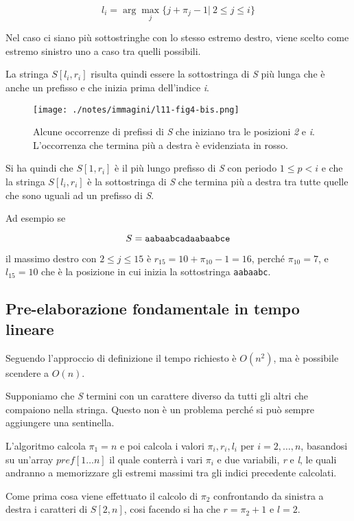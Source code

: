 $$
l_i = \arg\max\limits_{j} \{ j + \pi_j -1 | \: 2 \leq j \leq i\}
$$

Nel caso ci siano più sottostringhe con lo stesso estremo destro, viene scelto come estremo sinistro uno a caso tra quelli possibili.

La stringa $ S[l_i, r_i] $ risulta quindi essere la sottostringa di \textit{S} più lunga che è anche un prefisso e che inizia prima dell'indice \textit{i}.

\begin{figure}[htbp]
	\centering
	\texttt{[image: ./notes/immagini/l11-fig4-bis.png]}
	\caption{Alcune occorrenze di prefissi di \textit{S} che iniziano tra le posizioni \textit{2} e \textit{i}. L'occorrenza che termina più a destra è evidenziata in rosso.}
\end{figure}

Si ha quindi che $ S[1,r_i] $ è il più lungo prefisso di \textit{S} con periodo $ 1 \leq p < i $ e che la stringa $ S[l_i, r_i] $ è la sottostringa di \textit{S} che termina più a destra tra tutte quelle che sono uguali ad un prefisso di \textit{S}.

Ad esempio se 

$$
S = \text{\texttt{aabaabcadaabaabce}}
$$

il massimo destro con $ 2 \leq j \leq 15 $ è $ r_{15} = 10 + \pi_{10} -1 = 16$, perché $ \pi_{10} = 7$, e $ l_{15} = 10 $ che è la posizione in cui inizia la sottostringa \texttt{aabaabc}.

\subsection{Pre-elaborazione fondamentale in tempo lineare}\label{preambolazione-fondamentale-in-tempo-lineare}

Seguendo l'approccio di definizione il tempo richiesto è
$O(n^2)$, ma è possibile scendere a $O(n)$.

Supponiamo che \emph{S} termini con un carattere diverso da tutti gli
altri che compaiono nella stringa. Questo non è un problema perché si
può sempre aggiungere una sentinella.

L'algoritmo calcola $\pi_1 = n$ e poi calcola i valori $\pi_i, r_i, l_i$ per $i = 2,\ldots, n$, basandosi su un'array $ pref[1\ldots n] $ il quale conterrà i vari $ \pi_i $ e due variabili, \textit{r} e \textit{l}, le quali andranno a memorizzare gli estremi massimi tra gli indici precedente calcolati.

Come prima cosa viene effettuato il calcolo di $ \pi_2 $ confrontando da sinistra a destra i caratteri di $S[2,n]$, cosi facendo si ha che $ r = \pi_2 +1 $ e $l = 2$.

